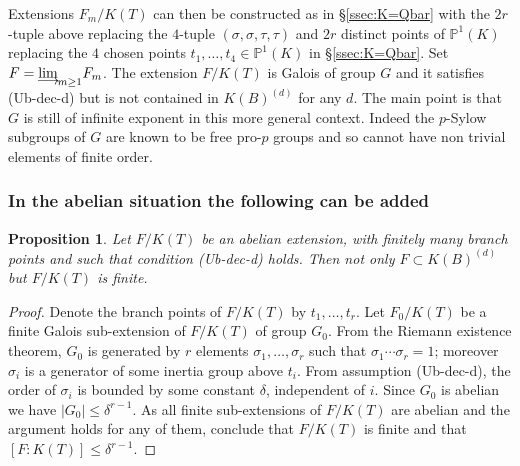 \documentclass[12pt,english]{amsart}
\newtheorem{twisting lemma}[theorem]{Twisting lemma}
\newtheorem{proposition}[theorem]{Proposition}
\begin{document}
Extensions $F_m/K(T)$ can then be constructed as in \S \ref{ssec:K=Qbar} with the $2r$-tuple above replacing the $4$-tuple $(\sigma,\sigma,\tau,\tau)$ and $2r$ distinct points of ${\mathbb{P}}^1(K)$ replacing the $4$ chosen points $t_1,\ldots,t_4\in {\mathbb{P}}^1(K)$ in \S \ref{ssec:K=Qbar}. Set $F={\mathop{\oalign{lim\cr
\hidewidth$\longrightarrow$\hidewidth\cr}}}_{m\geq 1} F_m$. The extension $F/K(T)$ is Galois of group $G$ and it satisfies {\rm (Ub-dec-d)} but is not  contained in  $K(B)^{(d)}$ for any $d$.
The main point is that $G$ is still of infinite exponent in this more general context. Indeed the $p$-Sylow subgroups of $G$ are known to be free pro-$p$ groups and so cannot have non trivial elements of finite order. 

\subsubsection{In the abelian situation {\rm the following can be added}}

\begin{proposition}
Let $F/K(T)$ be an abelian extension, with finitely many branch points and such that condition {\rm (Ub-dec-d)} holds. Then not only $F\subset K(B)^{(d)}$ but $F/K(T)$ is finite. 
\end{proposition}
 
\begin{proof} Denote the branch points of $F/K(T)$ by
$t_1,\ldots,t_r$. Let $F_0/K(T)$ be a finite Galois sub-extension of $F/K(T)$ of group $G_0$.
From the Riemann existence theorem, $G_0$ is generated by $r$ elements $\sigma_1,\ldots,\sigma_r$ such that $\sigma_1 \cdots\sigma_r = 1$; moreover $\sigma_i$ is a generator 
of some inertia group above $t_i$. From assumption (Ub-dec-d), the order of $\sigma_i$ is bounded by some constant $\delta$, independent of $i$. Since $G_0$ is abelian we have $|G_0|\leq {\delta}^{r-1}$. 
As all finite sub-extensions of $F/K(T)$ are abelian and the argument holds for any of them, conclude that $F/K(T)$ is finite and that $[F:K(T)]\leq {\delta}^{r-1}$.
\end{proof}



\end{document}

